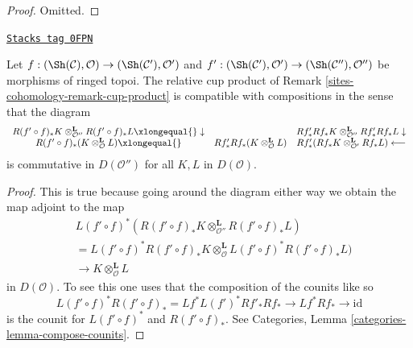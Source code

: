 \begin{proof}
Omitted.
\end{proof}

\begin{lemma}
\label{sites-cohomology-lemma-compose-cup-product}
\href{https://stacks.math.columbia.edu/tag/0FPN}{\texttt{Stacks tag 0FPN}}

Let $f : (\Sh(\mathcal{C}), \mathcal{O}) \to (\Sh(\mathcal{C}'), \mathcal{O}')$
and $f' : (\Sh(\mathcal{C}'), \mathcal{O}') \to
(\Sh(\mathcal{C}''), \mathcal{O}'')$
be morphisms of ringed topoi. The relative cup product of
Remark \ref{sites-cohomology-remark-cup-product} is compatible with compositions
in the sense that the diagram
$$
\begin{array}{ccc}R(f' \circ f)_*K \otimes_{\mathcal{O}''}^\mathbf{L} R(f' \circ f)_*L
\xlongequal{}\downarrow &  & Rf'_*Rf_*K \otimes_{\mathcal{O}''}^\mathbf{L} Rf'_*Rf_*L \downarrow \\ R(f' \circ f)_*(K \otimes_\mathcal{O}^\mathbf{L} L) \xlongequal{} & Rf'_*Rf_*(K \otimes_\mathcal{O}^\mathbf{L} L) & Rf'_*(Rf_*K \otimes_{\mathcal{O}'}^\mathbf{L}  Rf_*L) \longleftarrow\end{array}
$$
is commutative in $D(\mathcal{O}'')$ for all $K, L$ in $D(\mathcal{O})$.
\end{lemma}

\begin{proof}
This is true because going around the diagram either way we obtain the map
adjoint to the map
\begin{align*}
& L(f' \circ f)^*\left(R(f' \circ f)_*K
\otimes_{\mathcal{O}''}^\mathbf{L}
R(f' \circ f)_*L\right) \\
& =
L(f' \circ f)^*R(f' \circ f)_*K
\otimes_\mathcal{O}^\mathbf{L}
L(f' \circ f)^*R(f' \circ f)_*L) \\
& \to
K \otimes_\mathcal{O}^\mathbf{L} L
\end{align*}
in $D(\mathcal{O})$. To see this one uses that the composition
of the counits like so
$$
L(f' \circ f)^*R(f' \circ f)_* =
Lf^* L(f')^* Rf'_* Rf_*  \to
Lf^* Rf_* \to \text{id}
$$
is the counit for $L(f' \circ f)^*$ and $R(f' \circ f)_*$. See
Categories, Lemma \ref{categories-lemma-compose-counits}.
\end{proof}

